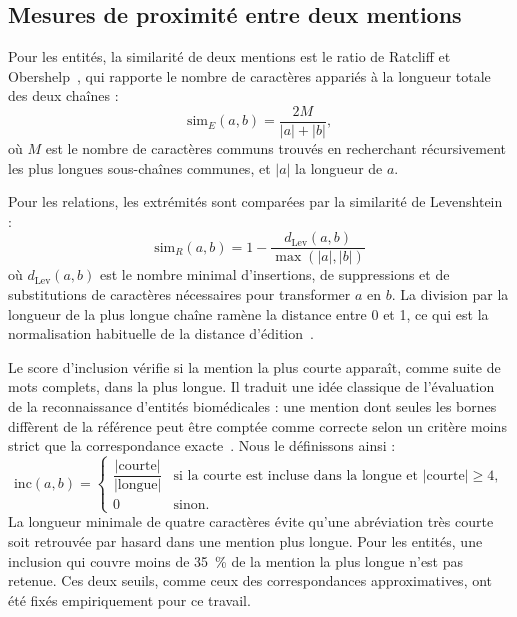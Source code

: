 \subsection{Mesures de proximité entre deux mentions}

Pour les entités, la similarité de deux mentions est le ratio de Ratcliff et Obershelp~\cite{ratcliff1988}, qui rapporte le nombre de caractères appariés à la longueur totale des deux chaînes :
\begin{equation}
\mathrm{sim}_E(a, b) = \frac{2M}{|a| + |b|},
\end{equation}
où $M$ est le nombre de caractères communs trouvés en recherchant récursivement les plus longues sous-chaînes communes, et $|a|$ la longueur de $a$.

Pour les relations, les extrémités sont comparées par la similarité de Levenshtein~\cite{levenshtein1966} :
\begin{equation}
\mathrm{sim}_R(a, b) = 1 - \frac{d_{\mathrm{Lev}}(a, b)}{\max(|a|, |b|)}
\end{equation}
où $d_{\mathrm{Lev}}(a,b)$ est le nombre minimal d'insertions, de suppressions et de substitutions de caractères nécessaires pour transformer $a$ en $b$. La division par la longueur de la plus longue chaîne ramène la distance entre 0 et 1, ce qui est la normalisation habituelle de la distance d'édition~\cite{navarro2001}.

Le score d'inclusion vérifie si la mention la plus courte apparaît, comme suite de mots complets, dans la plus longue. Il traduit une idée classique de l'évaluation de la reconnaissance d'entités biomédicales : une mention dont seules les bornes diffèrent de la référence peut être comptée comme correcte selon un critère moins strict que la correspondance exacte~\cite{tsai2006criteria}. Nous le définissons ainsi :
\begin{equation}
\mathrm{inc}(a, b) =
\begin{cases}
\dfrac{|\text{courte}|}{|\text{longue}|} & \text{si la courte est incluse dans la longue et } |\text{courte}| \geq 4,\\[2mm]
0 & \text{sinon.}
\end{cases}
\end{equation}
La longueur minimale de quatre caractères évite qu'une abréviation très courte soit retrouvée par hasard dans une mention plus longue. Pour les entités, une inclusion qui couvre moins de 35~\% de la mention la plus longue n'est pas retenue. Ces deux seuils, comme ceux des correspondances approximatives, ont été fixés empiriquement pour ce travail.

